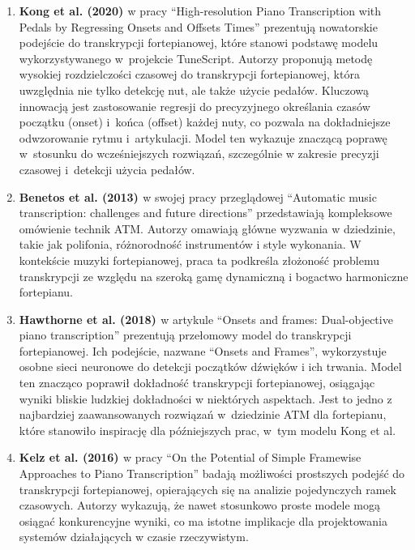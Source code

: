 \documentclass[a4paper,twoside,12pt]{book}
\begin{document}
\begin{enumerate}
	\item \textbf{Kong et al. (2020) \cite{bib:kong2020high}} w pracy ``High-resolution Piano Transcription with Pedals by Regressing Onsets and Offsets Times'' prezentują nowatorskie podejście do transkrypcji fortepianowej, które stanowi podstawę modelu wykorzystywanego w~projekcie TuneScript. Autorzy proponują metodę wysokiej rozdzielczości czasowej do transkrypcji fortepianowej, która uwzględnia nie tylko detekcję nut, ale także użycie pedałów. Kluczową innowacją jest zastosowanie regresji do precyzyjnego określania czasów początku (onset) i~końca (offset) każdej nuty, co pozwala na dokładniejsze odwzorowanie rytmu i~artykulacji. Model ten wykazuje znaczącą poprawę w~stosunku do wcześniejszych rozwiązań, szczególnie w zakresie precyzji czasowej i~detekcji użycia pedałów.
	      
	\item \textbf{Benetos et al. (2013) \cite{bib:benetos2013automatic}} w swojej pracy przeglądowej ``Automatic music transcription: challenges and future directions'' przedstawiają kompleksowe omówienie technik ATM. Autorzy omawiają główne wyzwania w dziedzinie, takie jak polifonia, różnorodność instrumentów i style wykonania. W kontekście muzyki fortepianowej, praca ta podkreśla złożoność problemu transkrypcji ze względu na szeroką gamę dynamiczną i bogactwo harmoniczne fortepianu.
	          
	\item \textbf{Hawthorne et al. (2018) \cite{bib:hawthorne2018onsets}} w artykule ``Onsets and frames: Dual-objective piano transcription'' prezentują przełomowy model do transkrypcji fortepianowej. Ich podejście, nazwane ``Onsets and Frames'', wykorzystuje osobne sieci neuronowe do detekcji początków dźwięków i ich trwania. Model ten znacząco poprawił dokładność transkrypcji fortepianowej, osiągając wyniki bliskie ludzkiej dokładności w niektórych aspektach. Jest to jedno z najbardziej zaawansowanych rozwiązań w~dziedzinie ATM dla fortepianu, które stanowiło inspirację dla późniejszych prac, w~tym modelu Kong et al.
	          
	\item \textbf{Kelz et al. (2016) \cite{bib:kelz2016potential}} w pracy ``On the Potential of Simple Framewise Approaches to Piano Transcription'' badają możliwości prostszych podejść do transkrypcji fortepianowej, opierających się na analizie pojedynczych ramek czasowych. Autorzy wykazują, że nawet stosunkowo proste modele mogą osiągać konkurencyjne wyniki, co ma istotne implikacje dla projektowania systemów działających w czasie rzeczywistym.
	          

\end{enumerate}
\end{document}
